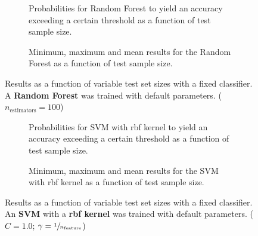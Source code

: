 
\begin{figure}
    \captionsetup[subfigure]{justification=justified,singlelinecheck=false}
    \begin{subfigure}[t]{0.61\textwidth}
        
        \caption{Probabilities for Random Forest to yield an accuracy exceeding a certain threshold as a function of test sample size.}
    \end{subfigure}
    \hspace{3.0mm}
    \begin{subfigure}[t]{0.34\textwidth}
        
        \caption{Minimum, maximum and mean results for the Random Forest as a function of test sample size.}
    \end{subfigure}
    \caption[Effects of varying test sample size. Random Forest; No preprocessing]{Results as a function of variable test set sizes with a fixed classifier. A \textbf{{Random Forest}} was trained with default parameters. ($n_\text{estimators}=\num{100}$)}
    \label{fig:no_PCA_no_selection_RandomForest}
\end{figure}

\begin{figure}
    \captionsetup[subfigure]{justification=justified,singlelinecheck=false}
    \begin{subfigure}[t]{0.61\textwidth}
        
        \caption{Probabilities for SVM with rbf kernel to yield an accuracy exceeding a certain threshold as a function of test sample size.}
    \end{subfigure}
    \hspace{3.0mm}
    \begin{subfigure}[t]{0.34\textwidth}
        
        \caption{Minimum, maximum and mean results for the SVM with rbf kernel as a function of test sample size.}
    \end{subfigure}
    \caption[Effects of varying test sample size. SVM (kernel = rbf); No preprocessing]{Results as a function of variable test set sizes with a fixed classifier. An \textbf{{SVM}} with a \textbf{{rbf kernel}} was trained with default parameters. ($C=\num{1.0}$; $\gamma=\sfrac{1}{n_\text{feature}}$)}
    \label{fig:no_PCA_no_selection_SVC}
\end{figure}

